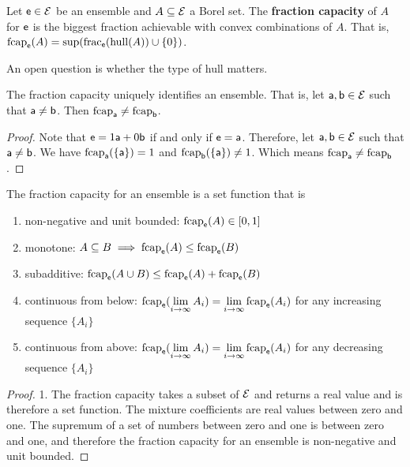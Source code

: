 \begin{mathSection}
	\begin{defn}
		Let $\ens \in \Ens$ be an ensemble and $A \subseteq \Ens$ a Borel set. The \textbf{fraction capacity} of $A$ for $\ens$ is the biggest fraction achievable with convex combinations of $A$. That is, $\fcap_{\ens}(A) = \sup(\fraction_{\ens}(\hull(A))\cup\{0\})$.
	\end{defn}
	
	\begin{remark}
		An open question is whether the type of hull matters.
	\end{remark}

	\begin{coro}
		The fraction capacity uniquely identifies an ensemble. That is, let $\ens[a], \ens[b] \in \Ens$ such that $\ens[a] \neq \ens[b]$. Then $\fcap_{\ens[a]} \neq \fcap_{\ens[b]}$.
	\end{coro}
	
	\begin{proof}
		Note that $\ens = 1 \ens[a] + 0 \ens[b]$ if and only if $\ens = \ens[a]$. Therefore, let $\ens[a], \ens[b] \in \Ens$ such that $\ens[a] \neq \ens[b]$. We have $\fcap_{\ens[a]}(\{\ens[a]\}) = 1$ and $\fcap_{\ens[b]}(\{\ens[a]\}) \neq 1$. Which means $\fcap_{\ens[a]} \neq \fcap_{\ens[b]}$.
	\end{proof}
	
	\begin{prop}
		The fraction capacity for an ensemble is a set function that is
		\begin{enumerate}
			\item non-negative and unit bounded: $\fcap_{\ens}(A) \in [0,1]$
			\item monotone: $A \subseteq B \implies \fcap_{\ens}(A) \leq \fcap_{\ens}(B)$
			\item subadditive: $\fcap_{\ens}(A \cup B) \leq \fcap_{\ens}(A) + \fcap_{\ens}(B)$
			\item continuous from below: $\fcap_{\ens}(\lim\limits_{i \to \infty} A_i) = \lim\limits_{i \to \infty} \fcap_{\ens}(A_i)$ for any increasing sequence $\{A_i\}$
			\item continuous from above: $\fcap_{\ens}(\lim\limits_{i \to \infty} A_i) = \lim\limits_{i \to \infty} \fcap_{\ens}(A_i)$ for any decreasing sequence $\{A_i\}$
		\end{enumerate}
	\end{prop}
	
	\begin{proof}
		1. The fraction capacity takes a subset of $\Ens$ and returns a real value and is therefore a set function. The mixture coefficients are real values between zero and one. The supremum of a set of numbers between zero and one is between zero and one, and therefore the fraction capacity for an ensemble is non-negative and unit bounded.
		

\end{proof}
\end{mathSection}
